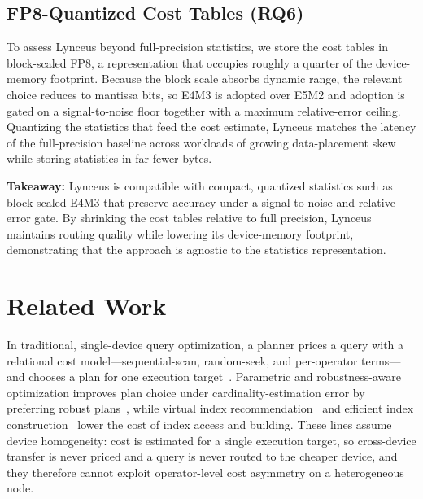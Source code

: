 \documentclass{article}
\begin{document}
\subsection{FP8-Quantized Cost Tables (RQ6)}
\label{sec:rq6}

To assess Lynceus beyond full-precision statistics, we store the cost tables in
block-scaled FP8, a representation that occupies roughly a quarter of the
device-memory footprint. Because the block scale absorbs dynamic range, the
relevant choice reduces to mantissa bits, so E4M3 is adopted over E5M2 and
adoption is gated on a signal-to-noise floor together with a maximum
relative-error ceiling. Quantizing the statistics that feed the cost estimate,
Lynceus matches the latency of the full-precision baseline across workloads of
growing data-placement skew while storing statistics in far fewer bytes.

\textbf{Takeaway:} Lynceus is compatible with compact, quantized statistics such
as block-scaled E4M3 that preserve accuracy under a signal-to-noise and
relative-error gate. By shrinking the cost tables relative to full precision,
Lynceus maintains routing quality while lowering its device-memory footprint,
demonstrating that the approach is agnostic to the statistics representation.

\section{Related Work}
\label{sec:related}

In traditional, single-device query optimization, a planner prices a query with a
relational cost model---sequential-scan, random-seek, and per-operator terms---and
chooses a plan for one execution target~\citep{selinger1979access}. Parametric and
robustness-aware optimization improves plan choice under cardinality-estimation
error by preferring robust plans~\citep{babcock2005robust}, while virtual index
recommendation~\citep{videx2024} and efficient index
construction~\citep{tabular2023} lower the cost of index access and building.
These lines assume device homogeneity: cost is estimated for a single execution
target, so cross-device transfer is never priced and a query is never routed to
the cheaper device, and they therefore cannot exploit operator-level cost
asymmetry on a heterogeneous node.
\end{document}
